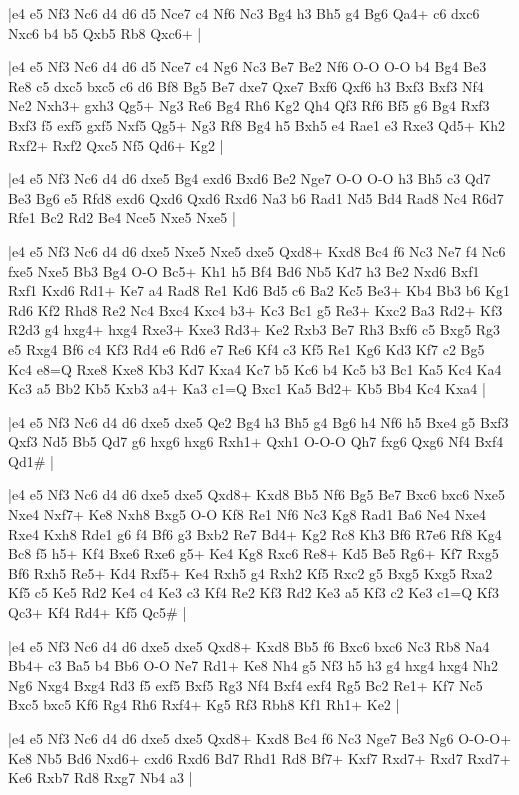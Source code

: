 \whitename{}
\blackname{}
\makegametitle
|e4 e5 Nf3 Nc6 d4 d6 d5 Nce7 c4 Nf6 Nc3 Bg4 h3 Bh5 g4 Bg6 Qa4+ c6 dxc6 Nxc6 b4 b5 Qxb5 Rb8 Qxc6+  |

\whitename{}
\blackname{}
\makegametitle
|e4 e5 Nf3 Nc6 d4 d6 d5 Nce7 c4 Ng6 Nc3 Be7 Be2 Nf6 O-O O-O b4 Bg4 Be3 Re8 c5 dxc5 bxc5 c6 d6 Bf8 Bg5 Be7 dxe7 Qxe7 Bxf6 Qxf6 h3 Bxf3 Bxf3 Nf4 Ne2 Nxh3+ gxh3 Qg5+ Ng3 Re6 Bg4 Rh6 Kg2 Qh4 Qf3 Rf6 Bf5 g6 Bg4 Rxf3 Bxf3 f5 exf5 gxf5 Nxf5 Qg5+ Ng3 Rf8 Bg4 h5 Bxh5 e4 Rae1 e3 Rxe3 Qd5+ Kh2 Rxf2+ Rxf2 Qxc5 Nf5 Qd6+ Kg2  |

\whitename{}
\blackname{}
\makegametitle
|e4 e5 Nf3 Nc6 d4 d6 dxe5 Bg4 exd6 Bxd6 Be2 Nge7 O-O O-O h3 Bh5 c3 Qd7 Be3 Bg6 e5 Rfd8 exd6 Qxd6 Qxd6 Rxd6 Na3 b6 Rad1 Nd5 Bd4 Rad8 Nc4 R6d7 Rfe1 Bc2 Rd2 Be4 Nce5 Nxe5 Nxe5  |

\whitename{}
\blackname{}
\makegametitle
|e4 e5 Nf3 Nc6 d4 d6 dxe5 Nxe5 Nxe5 dxe5 Qxd8+ Kxd8 Bc4 f6 Nc3 Ne7 f4 Nc6 fxe5 Nxe5 Bb3 Bg4 O-O Bc5+ Kh1 h5 Bf4 Bd6 Nb5 Kd7 h3 Be2 Nxd6 Bxf1 Rxf1 Kxd6 Rd1+ Ke7 a4 Rad8 Re1 Kd6 Bd5 c6 Ba2 Kc5 Be3+ Kb4 Bb3 b6 Kg1 Rd6 Kf2 Rhd8 Re2 Nc4 Bxc4 Kxc4 b3+ Kc3 Bc1 g5 Re3+ Kxc2 Ba3 Rd2+ Kf3 R2d3 g4 hxg4+ hxg4 Rxe3+ Kxe3 Rd3+ Ke2 Rxb3 Be7 Rh3 Bxf6 c5 Bxg5 Rg3 e5 Rxg4 Bf6 c4 Kf3 Rd4 e6 Rd6 e7 Re6 Kf4 c3 Kf5 Re1 Kg6 Kd3 Kf7 c2 Bg5 Kc4 e8=Q Rxe8 Kxe8 Kb3 Kd7 Kxa4 Kc7 b5 Kc6 b4 Kc5 b3 Bc1 Ka5 Kc4 Ka4 Kc3 a5 Bb2 Kb5 Kxb3 a4+ Ka3 c1=Q Bxc1 Ka5 Bd2+ Kb5 Bb4 Kc4 Kxa4  |

\whitename{}
\blackname{}
\makegametitle
|e4 e5 Nf3 Nc6 d4 d6 dxe5 dxe5 Qe2 Bg4 h3 Bh5 g4 Bg6 h4 Nf6 h5 Bxe4 g5 Bxf3 Qxf3 Nd5 Bb5 Qd7 g6 hxg6 hxg6 Rxh1+ Qxh1 O-O-O Qh7 fxg6 Qxg6 Nf4 Bxf4 Qd1\#  |

\whitename{}
\blackname{}
\makegametitle
|e4 e5 Nf3 Nc6 d4 d6 dxe5 dxe5 Qxd8+ Kxd8 Bb5 Nf6 Bg5 Be7 Bxc6 bxc6 Nxe5 Nxe4 Nxf7+ Ke8 Nxh8 Bxg5 O-O Kf8 Re1 Nf6 Nc3 Kg8 Rad1 Ba6 Ne4 Nxe4 Rxe4 Kxh8 Rde1 g6 f4 Bf6 g3 Bxb2 Re7 Bd4+ Kg2 Rc8 Kh3 Bf6 R7e6 Rf8 Kg4 Bc8 f5 h5+ Kf4 Bxe6 Rxe6 g5+ Ke4 Kg8 Rxc6 Re8+ Kd5 Be5 Rg6+ Kf7 Rxg5 Bf6 Rxh5 Re5+ Kd4 Rxf5+ Ke4 Rxh5 g4 Rxh2 Kf5 Rxc2 g5 Bxg5 Kxg5 Rxa2 Kf5 c5 Ke5 Rd2 Ke4 c4 Ke3 c3 Kf4 Re2 Kf3 Rd2 Ke3 a5 Kf3 c2 Ke3 c1=Q Kf3 Qc3+ Kf4 Rd4+ Kf5 Qc5\#  |

\whitename{}
\blackname{}
\makegametitle
|e4 e5 Nf3 Nc6 d4 d6 dxe5 dxe5 Qxd8+ Kxd8 Bb5 f6 Bxc6 bxc6 Nc3 Rb8 Na4 Bb4+ c3 Ba5 b4 Bb6 O-O Ne7 Rd1+ Ke8 Nh4 g5 Nf3 h5 h3 g4 hxg4 hxg4 Nh2 Ng6 Nxg4 Bxg4 Rd3 f5 exf5 Bxf5 Rg3 Nf4 Bxf4 exf4 Rg5 Bc2 Re1+ Kf7 Nc5 Bxc5 bxc5 Kf6 Rg4 Rh6 Rxf4+ Kg5 Rf3 Rbh8 Kf1 Rh1+ Ke2  |

\whitename{}
\blackname{}
\makegametitle
|e4 e5 Nf3 Nc6 d4 d6 dxe5 dxe5 Qxd8+ Kxd8 Bc4 f6 Nc3 Nge7 Be3 Ng6 O-O-O+ Ke8 Nb5 Bd6 Nxd6+ cxd6 Rxd6 Bd7 Rhd1 Rd8 Bf7+ Kxf7 Rxd7+ Rxd7 Rxd7+ Ke6 Rxb7 Rd8 Rxg7 Nb4 a3  |

